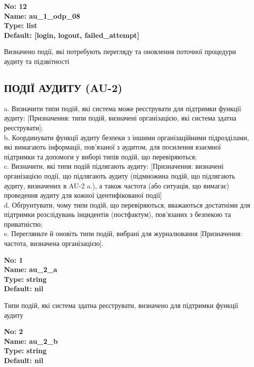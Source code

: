 \documentclass{article}
\begin{document}
{\footnotesize\bfseries
No: 12\\
Name: au\_\allowbreak{}1\_\allowbreak{}odp\_\allowbreak{}08\\
Type: list\\
Default: [\textquotedbl{}login\textquotedbl{}, \textquotedbl{}logout\textquotedbl{}, \textquotedbl{}failed\_\allowbreak{}attempt\textquotedbl{}]
}

{\footnotesize Визначено події, які потребують перегляду та оновлення поточної процедури аудиту та підзвітності}




\subsection{ПОДІЇ АУДИТУ (AU-2)}
a. Визначити типи подій, які система може реєструвати для підтримки функції аудиту: [Призначення: типи подій, визначені організацією, які система здатна реєструвати];\\ 
b. Координувати функції аудиту безпеки з іншими організаційними підрозділами, які вимагають інформації, пов'язаної з аудитом, для посилення взаємної підтримки та допомоги у виборі типів подій, що перевіряються;\\ 
c. Визначити, які типи подій підлягають аудиту: [Призначення: визначені організацією події, що підлягають аудиту (підмножина подій, що підлягають аудиту, визначених в AU-2 a.), а також частота (або ситуація, що вимагає) проведення аудиту для кожної ідентифікованої події]\\ 
d. Обґрунтувати, чому типи подій, що перевіряються, вважаються достатніми для підтримки розслідувань інцидентів (постфактум), пов'язаних з безпекою та приватністю;\\ 
e. Перегляньте й оновіть типи подій, вибрані для журналювання [Призначення: частота, визначена організацією].

\vspace{10pt}
{\footnotesize\bfseries
No: 1\\
Name: au\_\allowbreak{}2\_\allowbreak{}a\\
Type: string\\
Default: nil
}

{\footnotesize Типи подій, які система здатна реєструвати, визначено для підтримки функції аудиту}


{\footnotesize\bfseries
No: 2\\
Name: au\_\allowbreak{}2\_\allowbreak{}b\\
Type: string\\
Default: nil
}
\end{document}
